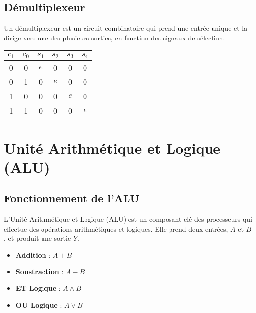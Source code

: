 \documentclass[10pt,a4paper]{article}
\begin{document}

\subsection*{Démultiplexeur}

Un démultiplexeur est un circuit combinatoire qui prend une entrée unique et la dirige vers une des plusieurs sorties, en fonction des signaux de sélection.

\begin{center}
    \begin{tabular}{|c|c|c|c|c|c|}
    \hline
    \( c_1 \) & \( c_0 \) & \( s_1 \) & \( s_2 \) & \( s_3 \) & \( s_4 \) \\
    \hline
    0 & 0 & \( e \) & 0 & 0 & 0 \\
    0 & 1 & 0 & \( e \) & 0 & 0 \\
    1 & 0 & 0 & 0 & \( e \) & 0 \\
    1 & 1 & 0 & 0 & 0 & \( e \) \\
    \hline
    \end{tabular}
\end{center}


\section*{Unité Arithmétique et Logique (ALU)}

\subsection*{Fonctionnement de l'ALU}

L'Unité Arithmétique et Logique (ALU) est un composant clé des processeurs qui effectue des opérations arithmétiques et logiques. Elle prend deux entrées, \( A \) et \( B \), et produit une sortie \( Y \).

\begin{itemize}
    \item \textbf{Addition} : \( A + B \)
    \item \textbf{Soustraction} : \( A - B \)
    \item \textbf{ET Logique} : \( A \land B \)
    \item \textbf{OU Logique} : \( A \lor B \)
\end{itemize}
\end{document}
